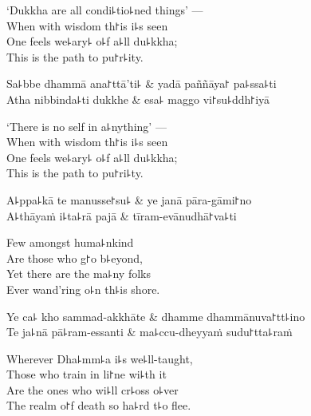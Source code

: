 \begin{english}
  `Dukkha are all condi꜕tio꜕ned things' ---\\
  When with wisdom th꜓is i꜕s seen\\
  One feels we꜕ary꜕ o꜕f a꜕ll du꜕kkha;\\
  This is the path to pu꜓r꜕ity.
\end{english}

\begin{twochants}
  Sa꜕bbe dhammā ana꜓ttā'ti꜕ & yadā paññāya꜓ pa꜕ssa꜕ti \\
  Atha nibbinda꜕ti dukkhe & esa꜕ maggo vi꜓su꜕ddh꜓iyā \\
\end{twochants}

\begin{english}
  `There is no self in a꜕nything' ---\\
  When with wisdom th꜓is i꜕s seen\\
  One feels we꜕ary꜕ o꜕f a꜕ll du꜕kkha;\\
  This is the path to pu꜓ri꜕ty.
\end{english}

\clearpage

\begin{twochants}
  A꜕ppa꜕kā te manusse꜓su꜕ & ye janā pāra-gāmi꜓no \\
  A꜕thāyaṁ i꜕ta꜕rā pajā & tīram-evānudhā꜓va꜕ti \\
\end{twochants}

\begin{english}
  Few amongst huma꜕nkind\\
  Are those who g꜓o b꜕eyond,\\
  Yet there are the ma꜕ny folks\\
  Ever wand'ring o꜕n th꜕is shore.
\end{english}

\begin{twochants}
  Ye ca꜕ kho sammad-akkhāte & dhamme dhammānuva꜓tt꜕ino \\
  Te ja꜕nā pā꜕ram-essanti & ma꜕ccu-dheyyaṁ sudu꜓tta꜕raṁ \\
\end{twochants}

\begin{english}
  Wherever Dha꜕mm꜕a i꜕s we꜕ll-taught,\\
  Those who train in li꜓ne wi꜕th it\\
  Are the ones who wi꜕ll cr꜕oss o꜕ver\\
  The realm o꜓f death so ha꜕rd t꜕o flee.
\end{english}

